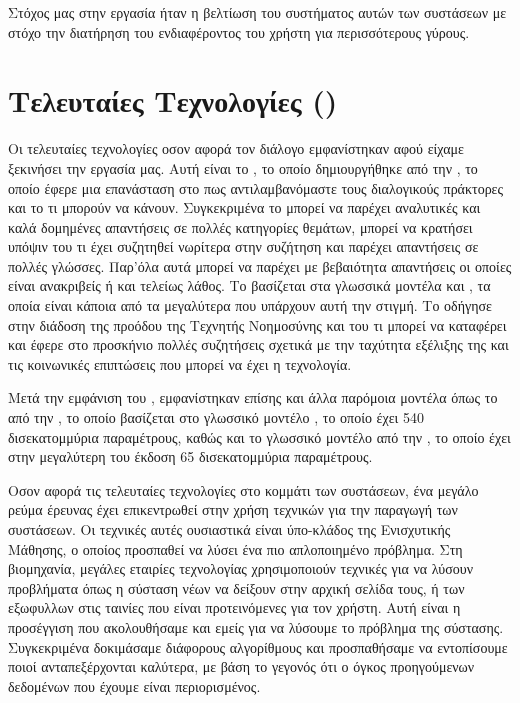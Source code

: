 Στόχος μας στην εργασία ήταν η βελτίωση του συστήματος αυτών των συστάσεων με στόχο την διατήρηση του ενδιαφέροντος του χρήστη για περισσότερους γύρους.

\section{Τελευταίες Τεχνολογίες ()}

Οι τελευταίες τεχνολογίες οσον αφορά τον διάλογο εμφανίστηκαν αφού είχαμε ξεκινήσει την εργασία μας. Αυτή είναι το , το οποίο δημιουργήθηκε από την , το οποίο έφερε μια επανάσταση στο πως αντιλαμβανόμαστε τους διαλογικούς πράκτορες και το τι μπορούν να κάνουν. Συγκεκριμένα το  μπορεί να παρέχει αναλυτικές και καλά δομημένες απαντήσεις σε πολλές κατηγορίες θεμάτων, μπορεί να κρατήσει υπόψιν του τι έχει συζητηθεί νωρίτερα στην συζήτηση και παρέχει απαντήσεις σε πολλές γλώσσες. Παρ'όλα αυτά μπορεί να παρέχει με βεβαιότητα απαντήσεις οι οποίες είναι ανακριβείς ή και τελείως λάθος. Το  βασίζεται στα γλωσσικά μοντέλα  και , τα οποία είναι κάποια από τα μεγαλύτερα που υπάρχουν αυτή την στιγμή. Το  οδήγησε στην διάδοση της προόδου της Τεχνητής Νοημοσύνης και του τι μπορεί να καταφέρει και έφερε στο προσκήνιο πολλές συζητήσεις σχετικά με την ταχύτητα εξέλιξης της και τις κοινωνικές επιπτώσεις που μπορεί να έχει η τεχνολογία.

Μετά την εμφάνιση του , εμφανίστηκαν επίσης και άλλα παρόμοια μοντέλα όπως το  από την , το οποίο βασίζεται στο γλωσσικό μοντέλο , το οποίο έχει 540 δισεκατομμύρια παραμέτρους, καθώς και το γλωσσικό μοντέλο  από την , το οποίο έχει στην μεγαλύτερη του έκδοση 65 δισεκατομμύρια παραμέτρους.

Οσον αφορά τις τελευταίες τεχνολογίες στο κομμάτι των συστάσεων, ένα μεγάλο ρεύμα έρευνας έχει επικεντρωθεί στην χρήση τεχνικών  για την παραγωγή των συστάσεων. Οι τεχνικές αυτές ουσιαστικά είναι ύπο-κλάδος της Ενισχυτικής Μάθησης, ο οποίος προσπαθεί να λύσει ένα πιο απλοποιημένο πρόβλημα. Στη βιομηχανία, μεγάλες εταιρίες τεχνολογίας χρησιμοποιούν τεχνικές  για να λύσουν προβλήματα όπως η σύσταση νέων να δείξουν στην αρχική σελίδα τους, ή των εξωφυλλων στις ταινίες που είναι προτεινόμενες για τον χρήστη. Αυτή είναι η προσέγγιση που ακολουθήσαμε και εμείς για να λύσουμε το πρόβλημα της σύστασης. Συγκεκριμένα δοκιμάσαμε διάφορους αλγορίθμους και προσπαθήσαμε να εντοπίσουμε ποιοί ανταπεξέρχονται καλύτερα, με βάση το γεγονός ότι ο όγκος προηγούμενων δεδομένων που έχουμε είναι περιορισμένος.

